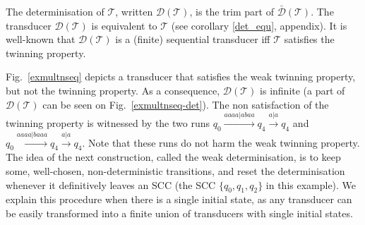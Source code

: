 \documentclass[envcountsame]{llncs}
\newcommand\tra{\mathcal{T}}
\begin{document}
The determinisation of $\tra$, written $\mathcal{D}(\tra)$, is the trim part of $\bar{\mathcal{D}}(\tra)$.
The transducer $\mathcal{D}(\tra)$ is equivalent to $\tra$ (see corollary \ref{det_equ}, appendix).
It is
well-known that $\mathcal{D}(\tra)$ is a (finite) sequential
transducer iff $\tra$ satisfies the twinning property. 




Fig.~\ref{exmultnseq} depicts a transducer that satisfies the weak twinning
property, but not the twinning property. As a consequence,
$\mathcal{D}(\tra)$ is infinite (a part of $\mathcal{D}(\tra)$ can be
seen on Fig.~\ref{exmultnseq-det}). The non satisfaction of the
twinning property is witnessed by the two runs $q_0\xrightarrow{aaaa|abaa} q_4 \xrightarrow{a|a} q_4$ and $q_0\xrightarrow{aaaa|baaa} q_4 \xrightarrow{a|a} q_4$. Note that these runs do not harm the weak
twinning property. The idea of the next construction,
called the weak determinisation, is to keep some, well-chosen, non-deterministic
transitions, and reset the determinisation whenever
it definitively leaves an SCC (the SCC $\{q_0,q_1,q_2\}$ in this
example). We explain this procedure when there is a single initial
state, as any transducer can be easily transformed into a finite
union of transducers with single initial states.
\end{document}
